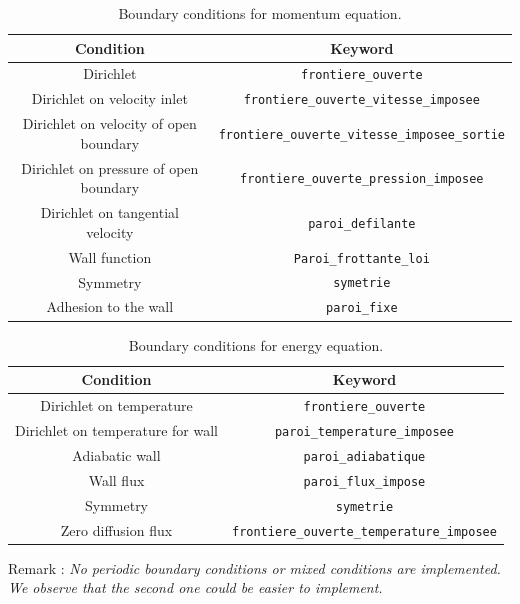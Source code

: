 \begin{table}[!ht]
    \centering
    \begin{tabular}{ c c }
        \toprule
        Condition & Keyword \\
        \midrule
        \rowcolor[gray]{0.9} Dirichlet & \texttt{frontiere\_ouverte} \\
        Dirichlet on velocity inlet & \texttt{frontiere\_ouverte\_vitesse\_imposee} \\
        \rowcolor[gray]{0.9} Dirichlet on velocity of open boundary &  \texttt{frontiere\_ouverte\_vitesse\_imposee\_sortie} \\
        Dirichlet on pressure of open boundary & \texttt{frontiere\_ouverte\_pression\_imposee} \\
        \rowcolor[gray]{0.9} Dirichlet on tangential velocity & \texttt{paroi\_defilante} \\
        Wall function & \texttt{Paroi\_frottante\_loi} \\
        \rowcolor[gray]{0.9} Symmetry & \texttt{symetrie} \\
        Adhesion to the wall & \texttt{paroi\_fixe} \\  
        \bottomrule
    \end{tabular}
    \caption{Boundary conditions for momentum equation.}\label{BCmomentum}
\end{table}

\begin{table}[!ht]
    \centering
    \begin{tabular}{ c c }  
       \toprule
        Condition & Keyword \\
        \midrule
        \rowcolor[gray]{0.9} Dirichlet on temperature & \texttt{frontiere\_ouverte} \\
        Dirichlet on temperature for wall & \texttt{paroi\_temperature\_imposee} \\
        \rowcolor[gray]{0.9} Adiabatic wall & \texttt{paroi\_adiabatique} \\
        Wall flux & \texttt{paroi\_flux\_impose} \\
        \rowcolor[gray]{0.9} Symmetry & \texttt{symetrie} \\
        Zero diffusion flux & \texttt{frontiere\_ouverte\_temperature\_imposee} \\
        \bottomrule
    \end{tabular}
        \caption{Boundary conditions for energy equation.}
    \label{BCenergy}

\end{table}

Remark : \textit{ No periodic boundary conditions or mixed conditions are implemented. We observe that the second one could be easier to implement.}
